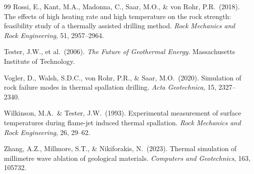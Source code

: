 \documentclass[12pt, a4paper]{article}
\begin{document}
\begin{thebibliography}{99}
Rossi, E., Kant, M.A., Madonna, C., Saar, M.O., \& von Rohr, P.R.\ (2018).
The effects of high heating rate and high temperature on the rock strength:
feasibility study of a thermally assisted drilling method.
\textit{Rock Mechanics and Rock Engineering}, 51, 2957--2964.

Tester, J.W., et al.\ (2006).
\textit{The Future of Geothermal Energy}.
Massachusetts Institute of Technology.

Vogler, D., Walsh, S.D.C., von Rohr, P.R., \& Saar, M.O.\ (2020).
Simulation of rock failure modes in thermal spallation drilling.
\textit{Acta Geotechnica}, 15, 2327--2340.

Wilkinson, M.A.\ \& Tester, J.W.\ (1993).
Experimental measurement of surface temperatures during flame-jet induced
thermal spallation.
\textit{Rock Mechanics and Rock Engineering}, 26, 29--62.

Zhang, A.Z., Millmore, S.T., \& Nikiforakis, N.\ (2023).
Thermal simulation of millimetre wave ablation of geological materials.
\textit{Computers and Geotechnics}, 163, 105732.

\end{thebibliography}
\end{document}
